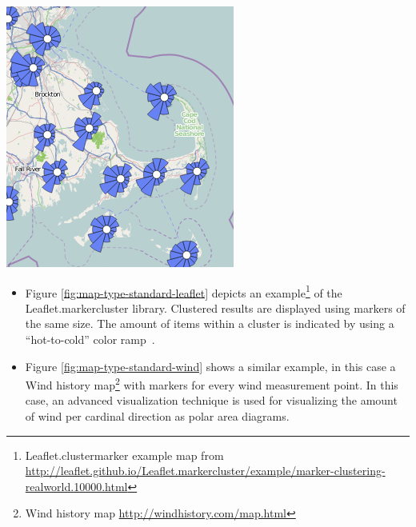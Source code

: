 \begin{itemize}
{    \includegraphics [width=\linewidth]{figures/map_types_standard_wind.png}
    \label{fig:map-type-standard-wind}
}

\begin{itemize}

\item Figure \ref{fig:map-type-standard-leaflet} depicts an example\footnote{Leaflet.clustermarker example map from \url{http://leaflet.github.io/Leaflet.markercluster/example/marker-clustering-realworld.10000.html}} of the Leaflet.markercluster library. Clustered results are displayed using markers of the same size. The amount of items within a cluster is indicated by using a ``hot-to-cold'' color ramp~\cite{web:color-ramp}. 

\item Figure \ref{fig:map-type-standard-wind} shows a similar example, in this case a Wind history map\footnote{Wind history map \url{http://windhistory.com/map.html}} with markers for every wind measurement point. In this case, an advanced visualization technique is used for visualizing the amount of wind per cardinal direction as polar area diagrams.


\end{itemize}
\end{itemize}
